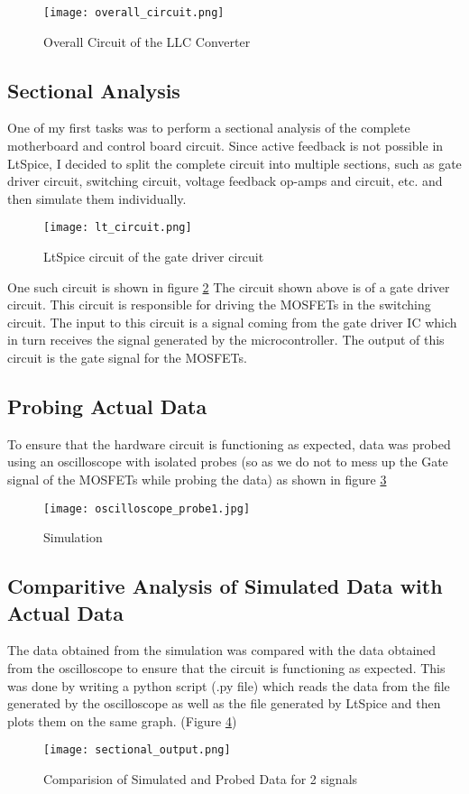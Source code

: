 \begin{figure}[H]
    \centering
    \texttt{[image: overall\_circuit.png]}
    \caption{Overall Circuit of the LLC Converter}
    \label{fig:Simulation1}
\end{figure}

\subsection{Sectional Analysis}
One of my first tasks was to perform a sectional analysis of the complete motherboard and control board circuit.
\noindent
Since active feedback is not possible in LtSpice, I decided to split the complete circuit into multiple sections, such as gate driver circuit, switching circuit, voltage feedback op-amps and circuit, etc. and then simulate them individually.\\
\begin{figure}[H]
    \centering
    \texttt{[image: lt\_circuit.png]}
    \caption{LtSpice circuit of the gate driver circuit}
    \label{fig:lt_circuit}
\end{figure}

\noindent
One such circuit is shown in figure \ref*{fig:lt_circuit}
\noindent
The circuit shown above is of a gate driver circuit. This circuit is responsible for driving the MOSFETs in the switching circuit. The input to this circuit is a signal coming from the gate driver IC which in turn receives the signal generated by the microcontroller. The output of this circuit is the gate signal for the MOSFETs.\\

\subsection{Probing Actual Data}
To ensure that the hardware circuit is functioning as expected, data was probed using an oscilloscope with isolated probes (so as we do not to mess up the Gate signal of the MOSFETs while probing the data) as shown in figure \ref*{fig:oscilloscope_probe}
\begin{figure}[H]
    \centering
    \texttt{[image: oscilloscope\_probe1.jpg]}
    \caption{Simulation}
    \label{fig:oscilloscope_probe}
\end{figure}

\subsection{Comparitive Analysis of Simulated Data with Actual Data}
The data obtained from the simulation was compared with the data obtained from the oscilloscope to ensure that the circuit is functioning as expected.
\noindent
This was done by writing a python script (.py file) which reads the data from the file generated by the oscilloscope as well as the file generated by LtSpice and then plots them on the same graph. (Figure \ref*{fig:sec_out})
\begin{figure}[H]
    \centering
    \texttt{[image: sectional\_output.png]}
    \caption{Comparision of Simulated and Probed Data for 2 signals}
    \label{fig:sec_out}
\end{figure}
